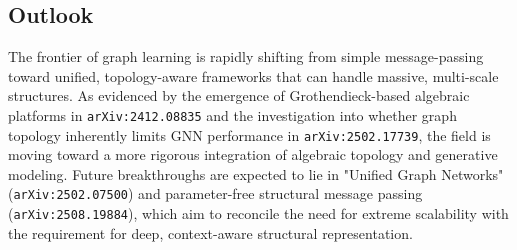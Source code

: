 \documentclass[11pt]{article}
\begin{document}
\subsection{Outlook}

The frontier of graph learning is rapidly shifting from simple message-passing toward unified, topology-aware frameworks that can handle massive, multi-scale structures. As evidenced by the emergence of Grothendieck-based algebraic platforms in \texttt{arXiv:2412.08835} and the investigation into whether graph topology inherently limits GNN performance in \texttt{arXiv:2502.17739}, the field is moving toward a more rigorous integration of algebraic topology and generative modeling. Future breakthroughs are expected to lie in "Unified Graph Networks" (\texttt{arXiv:2502.07500}) and parameter-free structural message passing (\texttt{arXiv:2508.19884}), which aim to reconcile the need for extreme scalability with the requirement for deep, context-aware structural representation.
\end{document}

